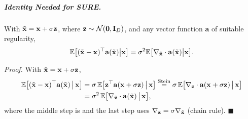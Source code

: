 \subparagraph{Identity Needed for SURE.}
\begin{lemma*}
With $\tilde{{\mathbf{x}}}={\mathbf{x}}+\sigma{\mathbf{z}}$, where ${\mathbf{z}} \sim \mathcal{N}(\mathbf{0},{\mathbf{I}}_D)$, and any vector function $\mathbf{a}$ of suitable regularity,
\begin{align}\label{eq:stein-for-sure}
    \mathbb{E}\big[(\tilde{{\mathbf{x}}}-{\mathbf{x}})^\top \mathbf{a}(\tilde{{\mathbf{x}}})  \big|  {\mathbf{x}}\big]
 =  \sigma^2 \mathbb{E}\big[ \nabla_{\tilde{{\mathbf{x}}}} \cdot\mathbf{a}(\tilde{{\mathbf{x}}})  \big|  {\mathbf{x}}\big]. 
\end{align}
\end{lemma*}
\begingroup\color{notesblue}%
\noindent\textit{Proof.} With $\tilde{{\mathbf{x}}} = {\mathbf{x}} + \sigma{\mathbf{z}}$,
\begin{align*}
\mathbb{E}\big[(\tilde{{\mathbf{x}}}-{\mathbf{x}})^\top \mathbf{a}(\tilde{{\mathbf{x}}})\,\big|\,{\mathbf{x}}\big]
&= \sigma\,\mathbb{E}\big[{\mathbf{z}}^\top \mathbf{a}({\mathbf{x}}+\sigma{\mathbf{z}})\,\big|\,{\mathbf{x}}\big]
\overset{\text{Stein}}{=} \sigma\,\mathbb{E}\big[\nabla_{{\mathbf{z}}}\cdot \mathbf{a}({\mathbf{x}}+\sigma{\mathbf{z}})\,\big|\,{\mathbf{x}}\big] \\
&= \sigma^2\,\mathbb{E}\big[\nabla_{\tilde{{\mathbf{x}}}}\cdot \mathbf{a}(\tilde{{\mathbf{x}}})\,\big|\,{\mathbf{x}}\big],
\end{align*}
where the middle step is  and the last step uses $\nabla_{{\mathbf{z}}} = \sigma\nabla_{\tilde{{\mathbf{x}}}}$ (chain rule). \hfill$\blacksquare$
\endgroup

